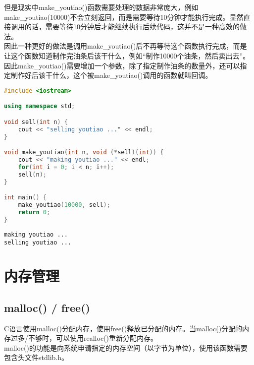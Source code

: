 但是现实中make\_youtiao()函数需要处理的数据非常庞大，例如make\_youtiao(10000)不会立刻返回，而是需要等待10分钟才能执行完成。显然直接调用的话，需要等待10分钟后才能继续执行后续代码，这并不是一种高效的做法。 \\

因此一种更好的做法是调用make\_youtiao()后不再等待这个函数执行完成，而是让这个函数知道制作完油条后该干什么，例如“制作10000个油条，然后卖出去”。 \\

因此make\_youtiao()需要增加一个参数，除了指定制作油条的数量外，还可以指定制作好后该干什么，这个被make\_youtiao()调用的函数就叫回调。 \\


\begin{lstlisting}[language=C++]
#include <iostream>

using namespace std;

void sell(int n) {
    cout << "selling youtiao ..." << endl;
}

void make_youtiao(int n, void (*sell)(int)) {
    cout << "making youtiao ..." << endl;
    for(int i = 0; i < n; i++);
    sell(n);
}

int main() {
    make_youtiao(10000, sell);
    return 0;
}
\end{lstlisting}

\begin{tcolorbox}
    \begin{verbatim}
making youtiao ...
selling youtiao ...
	\end{verbatim}
\end{tcolorbox}

\newpage

\section{内存管理}

\subsection{malloc() / free()}

C语言使用malloc()分配内存，使用free()释放已分配的内存。当malloc()分配的内存过多/不够时，可以使用realloc()重新分配内存。 \\

malloc()的功能是向系统申请指定的内存空间（以字节为单位），使用该函数需要包含头文件stdlib.h。

\vspace{-0.5cm}

